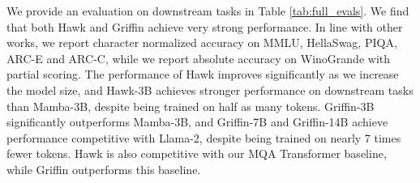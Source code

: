 \documentclass[11pt, a4paper, logo, onecolumn]{googledeepmind}
\theoremstyle{definition}
\begin{document}
We provide an evaluation on downstream tasks in Table \ref{tab:full_evals}. 
We find that both Hawk and Griffin achieve very strong performance. 
In line with other works, we report character normalized accuracy on MMLU, HellaSwag, PIQA, ARC-E and ARC-C, while we report absolute accuracy on WinoGrande with partial scoring. The performance of Hawk improves significantly as we increase the model size, and Hawk-3B achieves stronger performance on downstream tasks than Mamba-3B, despite being trained on half as many tokens. 
Griffin-3B significantly outperforms Mamba-3B, and Griffin-7B and Griffin-14B achieve performance competitive with Llama-2, despite being trained on nearly 7 times fewer tokens. Hawk is also competitive with our MQA Transformer baseline, while Griffin outperforms this baseline.
\end{document}

